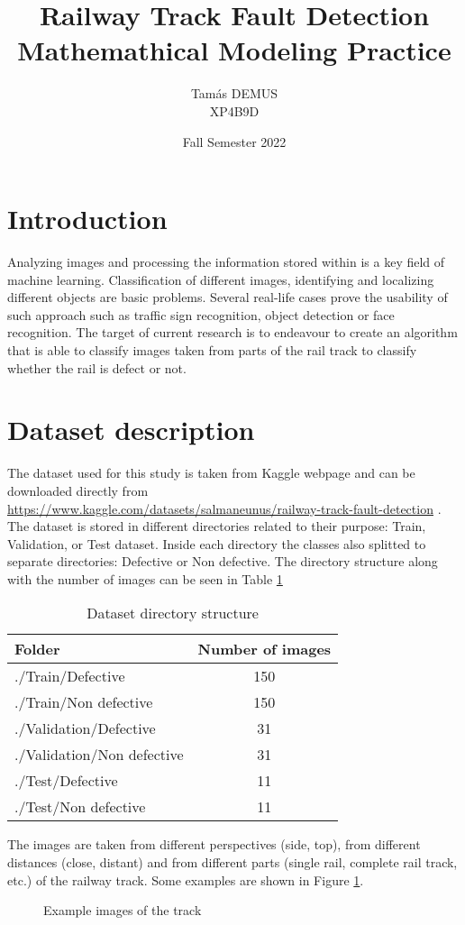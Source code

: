 \documentclass[10pt, final]{article}
\title{Railway Track Fault Detection\\\large Mathemathical Modeling Practice\\}
\author{Tamás DEMUS\\XP4B9D}
\date{Fall Semester 2022}
\begin{document}
	\maketitle
	\tableofcontents
	\section{Introduction}
	Analyzing images and processing the information stored within 
	is a key field of machine learning.
	Classification of different images, identifying and localizing 
	different objects are basic problems.
	Several real-life cases prove the usability of such approach 
	such as traffic sign recognition, object detection or face recognition.
	The target of current research is to endeavour to create an algorithm
	that is able to classify images taken from parts of the rail track
	 to classify whether the rail is defect or not.
	\section{Dataset description}
	The dataset used for this study is taken from Kaggle webpage \cite*{noauthor_kaggle_nodate}
	and can be downloaded directly from 
	\url{https://www.kaggle.com/datasets/salmaneunus/railway-track-fault-detection}
	\cite*{noauthor_railway_nodate}.
	The dataset is stored in different directories related to their purpose: Train, Validation,
	or Test dataset.
	Inside each directory the classes also splitted to separate directories: Defective or Non defective.
	The directory structure along with the number of images can be seen in Table \ref{table:dir_struct}
	\begin{table}[!h]
		\centering
		\begin{tabular}{l c}
			Folder & Number of images \\
			\hline
			./Train/Defective & 150 \\
			./Train/Non defective & 150 \\
			./Validation/Defective & 31 \\
			./Validation/Non defective & 31 \\
			./Test/Defective & 11 \\
			./Test/Non defective & 11 \\
			\hline
		\end{tabular}
		\caption{Dataset directory structure}
		\label{table:dir_struct}
	\end{table}
	The images are taken from different perspectives (side, top), from different distances (close, distant)
	and from different parts (single rail, complete rail track, etc.) of the railway track. 
	Some examples are shown in Figure \ref{fig:track_example}.
	\begin{figure}[!h]
		

		\caption{Example images of the track}
		\label{fig:track_example}
	\end{figure}
\end{document}
